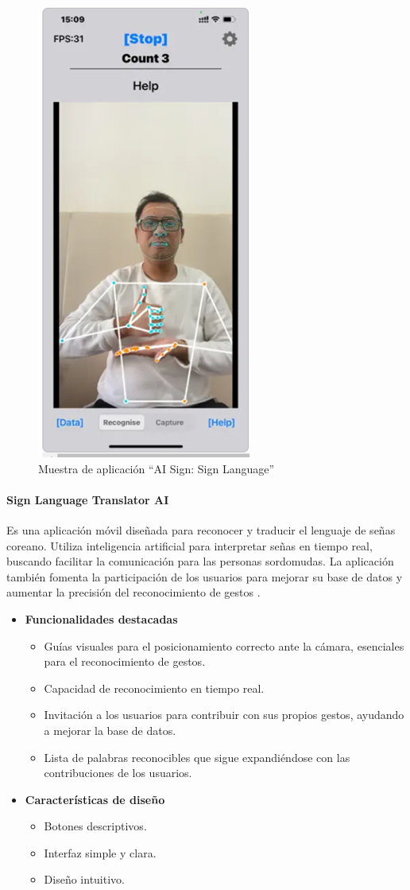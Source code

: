 \begin{figure} [H]
    \centering
    \includegraphics[width=0.25\linewidth]{figuras/ai_sign.png}
    \caption{Muestra de aplicación “AI Sign: Sign Language”}
    \label{fig:enter-label}
\end{figure}

\paragraph{Sign Language Translator AI}

Es una aplicación móvil diseñada para reconocer y traducir el lenguaje de señas coreano. Utiliza inteligencia artificial para interpretar señas en tiempo real, buscando facilitar la comunicación para las personas sordomudas. La aplicación también fomenta la participación de los usuarios para mejorar su base de datos y aumentar la precisión del reconocimiento de gestos \cite{SignLanguageTranslatorAI}.

\begin{itemize}
    \item \textbf{Funcionalidades destacadas}
    \begin{itemize}
        \item Guías visuales para el posicionamiento correcto ante la cámara, esenciales para el reconocimiento de gestos.
        \item Capacidad de reconocimiento en tiempo real.
        \item Invitación a los usuarios para contribuir con sus propios gestos, ayudando a mejorar la base de datos.
        \item Lista de palabras reconocibles que sigue expandiéndose con las contribuciones de los usuarios.
    \end{itemize}

    \item \textbf{Características de diseño}
    \begin{itemize}
        \item Botones descriptivos.
        \item Interfaz simple y clara.
        \item Diseño intuitivo.
    \end{itemize}
\end{itemize}


